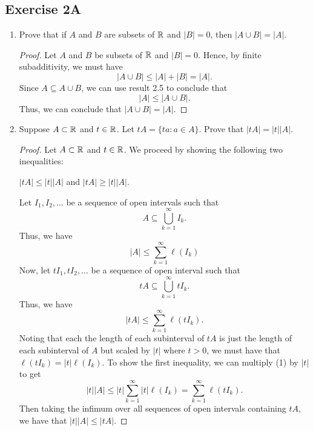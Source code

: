 \documentclass[11pt,a4paper]{book}
\begin{document}
\subsection{Exercise 2A}

\begin{enumerate}
    \item Prove that if \( A  \) and \( B  \) are subsets of \( \mathbb{R}  \) and \( | B  |  = 0  \), then \( | A \cup B  | = | A  |  \).
        \begin{proof}
        Let \( A  \) and \( B  \) be subsets of \( \mathbb{R}  \) and \( | B  |  = 0  \). Hence, by finite subadditivity, we must have 
        \[  | A \cup B  |  \leq | A  |  + | B  | = | A  |. \]
        Since \( A \subseteq A \cup B  \), we can use result 2.5 to conclude that
        \[  | A |  \leq |  A \cup B |.  \]
        Thus, we can conclude that \( | A  \cup B  |  = | A  | \).
        \end{proof}
    \item Suppose \( A \subset \mathbb{R}  \) and \( t \in \mathbb{R} \). Let \( tA = \{ ta  : a \in A  \} .  \) Prove that \( | tA  |  = | t  |  | A  |  \).
        \begin{proof}
        Let \( A \subset \mathbb{R}  \) and \( t \in \mathbb{R}  \). We proceed by showing the following two inequalities:  
        \begin{center}
            \( | t A  |  \leq | t  |  | A  |   \) and \(  | t A  |  \geq | t  |  | A  |  \). 
        \end{center}
        Let \( {I}_{1}, {I}_{2}, \dots  \) be a sequence of open intervals such that 
        \[  A \subseteq \bigcup_{ k=1  }^{ \infty  }  {I}_{k }. \]
        Thus, we have 
        \[  | A  |  \leq \sum_{ k=1  }^{ \infty  } \ell({I}_{k }) \tag{1} \]
        Now, let \( t {I}_{1}, t {I}_{2}, \dots  \) be a sequence of open interval such that
        \[   tA   \subseteq \bigcup_{ k=1  }^{ \infty   }  t {I}_{k }. \]
        Thus, we have
        \[  | t A  |  \leq \sum_{ k=1  }^{ \infty  } \ell(t {I}_{k }). \tag{2} \]
        Noting that each the length of each subinterval of \( tA  \) is just the length of each subinterval of \( A  \) but scaled by \( | t  |  \) where \( t > 0  \), we must have that \( \ell(t {I}_{k }) = | t  | \ell ({I}_{k })  \). To show the first inequality, we can multiply (1) by \( | t |  \) to get
        \[  | t  |  | A  |  \leq | t  |  \sum_{ k=1  }^{ \infty  } | t  |  \ell({I}_{k }) = \sum_{ k=1  }^{ \infty  } \ell(t {I}_{k }). \]
        Then taking the infimum over all sequences of open intervals containing \( t A  \), we have that \( | t  |  | A  |  \leq | t A  |  \). 


\end{proof}
\end{enumerate}
\end{document}
